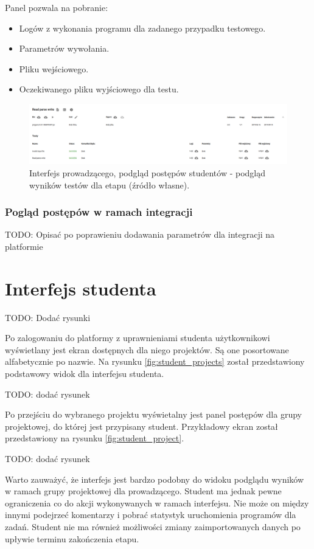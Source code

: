 Panel pozwala na pobranie:
\begin{itemize}
    \item Logów z wykonania programu dla zadanego przypadku testowego.
    \item Parametrów wywołania.
    \item Pliku wejściowego.
    \item Oczekiwanego pliku wyjściowego dla testu.
\end{itemize}

\begin{figure}[h]
    \centering
    \includegraphics[width = 13cm]{chapter04/lecturer_preview_stage_tests.png}
    \caption{Interfejs prowadzącego, podgląd postępów studentów - podgląd wyników testów dla etapu (źródło własne).}
    \label{fig:lecturer-preview-stage-tests}
\end{figure}

\subsubsection{Pogląd postępów w ramach integracji}
TODO: Opisać po poprawieniu dodawania parametrów dla integracji na platformie



\section{Interfejs studenta}
TODO: Dodać rysunki

Po zalogowaniu do platformy z uprawnieniami studenta użytkownikowi wyświetlany jest ekran dostępnych dla niego projektów.
Są one posortowane alfabetycznie po nazwie.
Na rysunku \ref{fig:student_projects} został przedstawiony podstawowy widok dla interfejsu studenta.

TODO: dodać rysunek

Po przejściu do wybranego projektu wyświetalny jest panel postępów dla grupy projektowej, do której jest przypisany student.
Przykładowy ekran został przedstawiony na rysunku \ref{fig:student_project}.

TODO: dodać rysunek

Warto zauważyć, że interfejs jest bardzo podobny do widoku podglądu wyników w ramach grupy projektowej dla prowadzącego.
Student ma jednak pewne ograniczenia co do akcji wykonywanych w ramach interfejsu.
Nie może on między innymi podejrzeć komentarzy i pobrać statystyk uruchomienia programów dla zadań.
Student nie ma również możliwości zmiany zaimportowanych danych po upływie terminu zakończenia etapu.

